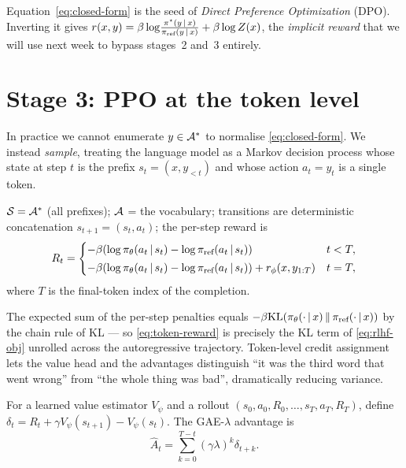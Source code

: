 \documentclass[11pt,oneside]{scrbook}
\begin{document}
\begin{remark}
Equation~\eqref{eq:closed-form} is the seed of \emph{Direct Preference
Optimization} (DPO). Inverting it gives
$r(x, y) = \beta \log\!\frac{\pi^\star(y \,\vert\, x)}{\pi_{\text{ref}}(y \,\vert\, x)} + \beta \log Z(x)$,
the \emph{implicit reward} that we will use next week to bypass
stages~2 and~3 entirely.
\end{remark}

\section{Stage 3: PPO at the token level}

In practice we cannot enumerate $y \in \mathcal{A}^*$ to normalise
\eqref{eq:closed-form}. We instead \emph{sample}, treating the language
model as a Markov decision process whose state at step $t$ is the prefix
$s_t = (x, y_{<t})$ and whose action $a_t = y_t$ is a single token.

\begin{definition}
\label{def:tokenmdp}
$\mathcal{S} = \mathcal{A}^*$ (all prefixes); $\mathcal{A}$ = the vocabulary;
transitions are deterministic concatenation $s_{t+1} = (s_t, a_t)$;
the per-step reward is
\begin{equation}
R_t =
\begin{cases}
- \beta\!\left(\log \pi_\theta(a_t \,\vert\, s_t) - \log \pi_{\text{ref}}(a_t \,\vert\, s_t)\right) & t < T, \\[2pt]
- \beta\!\left(\log \pi_\theta(a_t \,\vert\, s_t) - \log \pi_{\text{ref}}(a_t \,\vert\, s_t)\right) + r_\phi(x, y_{1:T}) & t = T,
\end{cases}
\label{eq:token-reward}
\end{equation}
where $T$ is the final-token index of the completion.
\end{definition}

\begin{remark}
The expected sum of the per-step penalties equals
$-\beta \mathrm{KL}(\pi_\theta(\cdot \,\vert\, x) \,\|\, \pi_{\text{ref}}(\cdot \,\vert\, x))$ by
the chain rule of KL --- so \eqref{eq:token-reward} is precisely the
KL term of \eqref{eq:rlhf-obj} unrolled across the autoregressive
trajectory. Token-level credit assignment lets the value head and
the advantages distinguish ``it was the third word that went wrong''
from ``the whole thing was bad'', dramatically reducing variance.
\end{remark}

\begin{definition}
\label{def:gae}
For a learned value estimator $V_\psi$ and a rollout
$(s_0, a_0, R_0, \ldots, s_T, a_T, R_T)$, define $\delta_t = R_t +
\gamma V_\psi(s_{t+1}) - V_\psi(s_t)$. The GAE-$\lambda$ advantage is
\begin{equation}
\hat A_t = \sum_{k=0}^{T-t} (\gamma\lambda)^k \delta_{t+k}.
\label{eq:gae}
\end{equation}
\end{definition}
\end{document}
